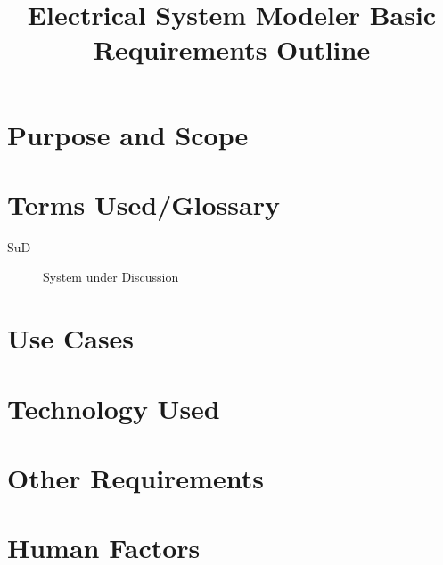 \documentclass[12pt]{article}
\title{
	Electrical System Modeler Basic\\
	Requirements Outline
}
\begin{document}
	\maketitle
	
	\pagebreak
	\renewcommand*\contentsname{Summary}
	\tableofcontents{}
	\pagebreak
	
	\section{Purpose and Scope}
	
	\section{Terms Used/Glossary}
	
	\begin{description}
		\item[SuD] System under Discussion
	\end{description}

	\section{Use Cases}
	
	\section{Technology Used}
	
	\section{Other Requirements}
	
	\section{Human Factors}
\end{document}
